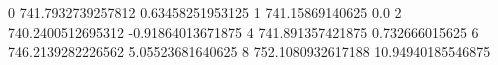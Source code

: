 0 741.7932739257812 0.63458251953125
1 741.15869140625 0.0
2 740.2400512695312 -0.91864013671875
4 741.891357421875 0.732666015625
6 746.2139282226562 5.05523681640625
8 752.1080932617188 10.94940185546875
